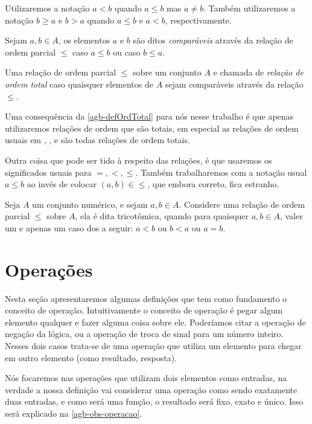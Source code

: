 \documentclass[../main.tex]{subfiles}
\begin{document}
\begin{defi}
    Utilizaremos a notação $a < b$ quando $a \leq b$ mas $a \neq b$. Também utilizaremos a notação $b \geq a$ e $b > a$ quando $a \leq b$ e $a < b$, respectivamente.
\end{defi}

\begin{defi}
    Sejam $a,b \in A$, os elementos $a$ e $b$ são ditos \emph{comparáveis} através da relação de ordem parcial $\leq$ caso $a \leq b$ ou caso $b \leq a$. 
\end{defi}

\begin{defi}\label{agb-defOrdTotal}
    Uma relação de ordem parcial $\leq$ sobre um conjunto $A$ e chamada de \emph{relação de ordem total} caso quaisquer elementos de $A$ sejam comparáveis através da relação $\leq$.
\end{defi}

Uma consequência da \cref{agb-defOrdTotal} para nós nesse trabalho é que apenas utilizaremos relações de ordem que são totais, em especial as relações de ordem usuais em \N, \Z, \Q e \R são todas relações de ordem totais.

Outra coisa que pode ser tido à respeito das relações, é que usaremos os significados usuais para $=, <, \leq$. Também trabalharemos com a notação usual $a \leq b$ ao invés de colocar $(a,b) \in \leq$, que embora correto, fica estranho. 

\begin{defi}
    Seja $A$ um conjunto numérico, e sejam $a,b \in A$. Considere uma relação de ordem parcial $\leq$ sobre $A$, ela é dita tricotômica,
    quando para quaisquer $a,b \in A$, valer um e apenas um caso dos a seguir: $a < b$ ou $b < a$ ou $a = b$.
\end{defi}
\section{Operações}

Nesta seção apresentaremos algumas definições que tem como fundamento o conceito de operação. Intuitivamente o conceito de operação é pegar algum elemento qualquer e fazer alguma coisa sobre ele. Poderíamos citar a operação de negação da lógica, ou a operação de troca de sinal para um número inteiro. Nesses dois casos trata-se de uma operação que utiliza um elemento para chegar em outro elemento (como resultado, resposta).

Nós focaremos nas operações que utilizam dois elementos como entradas, na verdade a nossa definição vai considerar uma operação como sendo exatamente duas entradas, e como será uma função, o resultado será fixo, exato e único. Isso será explicado na \cref{agb-obs-operacao}.
\end{document}
